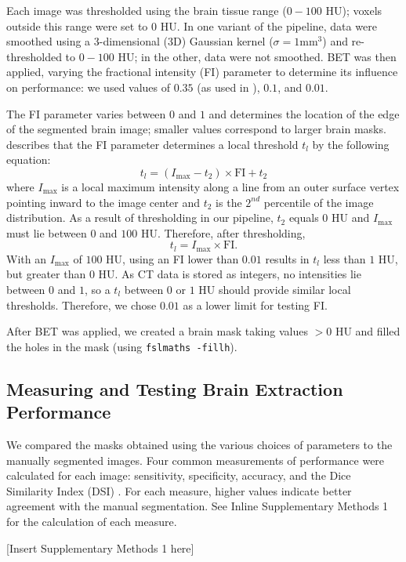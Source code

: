 \documentclass{elsarticle}\usepackage[]{graphicx}\usepackage[]{color}
\begin{document}
Each image was thresholded using the brain tissue range ($0-100$ HU); voxels outside this range were set to $0$ HU.  In one variant of the pipeline, data were smoothed using a 3-dimensional (3D) Gaussian kernel ($\sigma=1$mm$^3$) and re-thresholded to $0-100$ HU; in the other, data were not smoothed.  BET was then applied, varying the fractional intensity (FI) parameter to determine its influence on performance: we used values of $0.35$ (as used in \citet{rorden_age-specific_2012}), $0.1$, and $0.01$.  

The FI parameter varies between $0$ and $1$ and determines the location of the edge of the segmented brain image; smaller values correspond to larger brain masks. \citet{smith_fast_2002} describes that the FI parameter determines a local threshold $t_{l}$ by the following equation:
$$
t_{l} = \left(I_{\text{max}} - t_2\right) \times \text{FI} + t_2
$$
where $I_{\text{max}}$ is a local maximum intensity along a line from an outer surface vertex pointing inward to the image center and $t_2$ is the $2^{nd}$ percentile of the image distribution.  As a result of thresholding in our pipeline, $t_2$ equals $0$ HU and $I_{\text{max}}$ must lie between $0$ and $100$ HU.  Therefore, after thresholding,
$$
t_{l} = I_{\text{max}} \times \text{FI}.
$$
With an $I_{\text{max}}$ of $100$ HU, using an FI lower than $0.01$ results in $t_{l}$ less than $1$ HU, but greater than $0$ HU.  As CT data is stored as integers, no intensities lie between $0$ and $1$, so a $t_{l}$ between $0$ or $1$ HU should provide similar local thresholds.  Therefore, we chose $0.01$ as a lower limit for testing FI. 


After BET was applied, we created a brain mask taking values $> 0$ HU and filled the holes in the mask (using \verb|fslmaths -fillh|).  


\subsection{Measuring and Testing Brain Extraction Performance}
We compared the masks obtained using the various choices of parameters to the manually segmented images.  Four common measurements of performance were calculated for each image: sensitivity, specificity, accuracy, and the Dice Similarity Index (DSI) \citep{dice_measures_1945}.  For each measure, higher values indicate better agreement with the manual segmentation.  See Inline Supplementary Methods 1 for the calculation of each measure.

[Insert Supplementary Methods 1 here]
\end{document}
